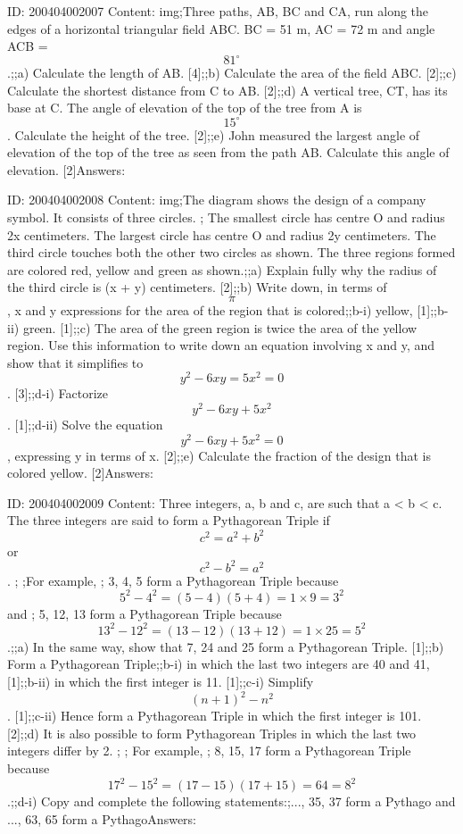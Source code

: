 \documentclass{article}
\begin{document}
ID: 200404002007
Content:
img;Three paths, AB, BC and CA, run along the edges of a horizontal triangular field ABC. BC = 51 m, AC = 72 m and angle ACB = $$81^{\circ}$$.;;a) Calculate the length of AB. [4];;b) Calculate the area of the field ABC. [2];;c) Calculate the shortest distance from C to AB. [2];;d) A vertical tree, CT, has its base at C. The angle of elevation of the top of the tree from A is $$15^{\circ}$$. Calculate the height of the tree. [2];;e) John measured the largest angle of elevation of the top of the tree as seen from the path AB. Calculate this angle of elevation. [2]Answers:

ID: 200404002008
Content:
img;The diagram shows the design of a company symbol. It consists of three circles. ; The smallest circle has centre O and radius 2x centimeters. The largest circle has centre O and radius 2y centimeters. The third circle touches both the other two circles as shown. The three regions formed are colored red, yellow and green as shown.;;a) Explain fully why the radius of the third circle is (x + y) centimeters. [2];;b) Write down, in terms of $$\pi$$, x and y expressions for the area of the region that is colored;;b-i) yellow, [1];;b-ii) green. [1];;c) The area of the green region is twice the area of the yellow region. Use this information to write down an equation involving x and y, and show that it simplifies to $$y^{2} -6xy=5x^{2} =0$$. [3];;d-i) Factorize $$y^{2} -6xy+5x^{2} $$. [1];;d-ii) Solve the equation $$y^{2} -6xy+5x^{2}=0$$, expressing y in terms of x. [2];;e) Calculate the fraction of the design that is colored yellow. [2]Answers:

ID: 200404002009
Content:
Three integers, a, b and c, are such that a < b < c. The three integers are said to form a Pythagorean Triple if $$c^{2} =a^{2} +b^{2} $$ or $$c^{2} -b^{2} =a^{2} $$. ; ;For example, ; 3, 4, 5 form a Pythagorean Triple because $$5^{2} -4^{2}  =(5-4)(5+4)= 1 \times 9=3^{2} $$ and ; 5, 12, 13 form a Pythagorean Triple because $$13^{2} -12^{2} =(13-12)(13+12)=1 \times 25 =5^{2} $$.;;a) In the same way, show that 7, 24 and 25 form a Pythagorean Triple. [1];;b) Form a Pythagorean Triple;;b-i) in which the last two integers are 40 and 41, [1];;b-ii) in which the first integer is 11. [1];;c-i) Simplify $$(n+1)^{2} -n^{2} $$. [1];;c-ii) Hence form a Pythagorean Triple in which the first integer is 101. [2];;d) It is also possible to form Pythagorean Triples in which the last two integers differ by 2. ; ; For example, ; 8, 15, 17 form a Pythagorean Triple because $$17^{2} -15^{2} =(17-15)(17+15)=64=8^{2} $$.;;d-i) Copy and complete the following statements:;..., 35, 37 form a Pythago and ..., 63, 65 form a PythagoAnswers:
\end{document}
